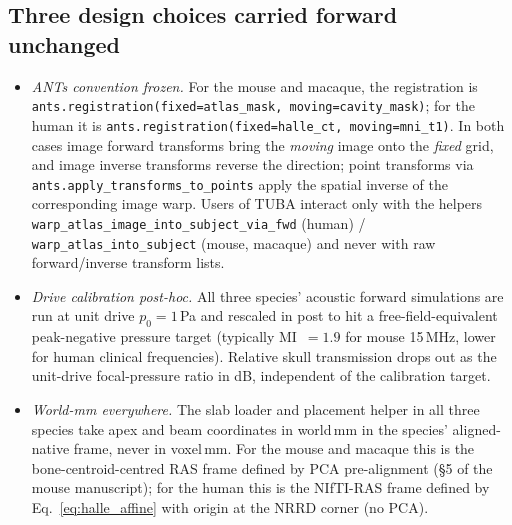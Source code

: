 \documentclass{compactarticle}
\begin{document}
\subsection{Three design choices carried forward unchanged}
\begin{itemize}
\item {\em ANTs convention frozen.} For the mouse and macaque, the
  registration is
  \texttt{ants.registration(fixed=atlas\_mask, moving=cavity\_mask)};
  for the human it is
  \texttt{ants.registration(fixed=halle\_ct, moving=mni\_t1)}. In both
  cases image forward transforms bring the {\em moving} image onto the
  {\em fixed} grid, and image inverse transforms reverse the
  direction; point transforms via
  \texttt{ants.apply\_transforms\_to\_points} apply the spatial inverse
  of the corresponding image warp. Users of TUBA interact only with the
  helpers \texttt{warp\_atlas\_image\_into\_subject\_via\_fwd} (human)
  / \texttt{warp\_atlas\_into\_subject} (mouse, macaque) and never
  with raw forward/inverse transform lists.
\item {\em Drive calibration post-hoc.} All three species' acoustic
  forward simulations are run at unit drive $p_0=1$\,Pa and rescaled
  in post to hit a free-field-equivalent peak-negative pressure
  target (typically MI~$=1.9$ for mouse 15\,MHz, lower for human
  clinical frequencies). Relative skull transmission drops out as the
  unit-drive focal-pressure ratio in dB, independent of the calibration
  target.
\item {\em World-mm everywhere.} The slab loader and placement helper
  in all three species take apex and beam coordinates in world\,mm in
  the species' aligned-native frame, never in voxel\,mm. For the
  mouse and macaque this is the bone-centroid-centred RAS frame
  defined by PCA pre-alignment (\S5 of the mouse manuscript); for the
  human this is the NIfTI-RAS frame defined by Eq.~\ref{eq:halle_affine}
  with origin at the NRRD corner (no PCA).
\end{itemize}
\end{document}

